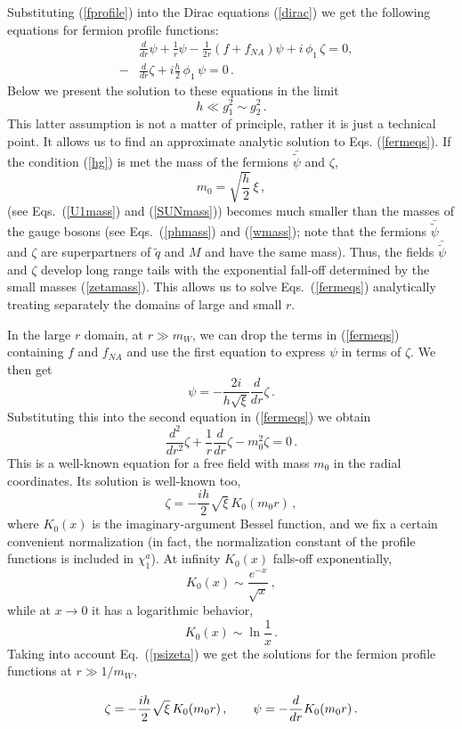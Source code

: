 \documentclass[epsfig,12pt]{article}
\def\beqn{\begin{eqnarray}}
\def\eeqn{\end{eqnarray}}
\def\beq{\begin{equation}}
\def\eeq{\end{equation}}
\begin{document}
Substituting (\ref{fprofile}) into the Dirac equations (\ref{dirac})
 we get the following equations for fermion profile functions:
\beqn
&&\frac{d}{dr}\psi +\frac1r\psi
-\frac1{2r}(f+f_{NA})\psi +i\,\phi_1\,\zeta=0,
\nonumber\\[3mm]
&-&\frac{d}{dr}\zeta
+i\frac{h}{2}\,\phi_1\,\psi =0\,.
\label{fermeqs}
\eeqn
Below we present the  solution to these equations
in the limit
\beq 
h\ll g_1^2\sim g_2^2  \,. 
\label{hg} 
\eeq
This latter assumption is not a matter of principle, rather it is just a technical
point. It allows us to find an approximate analytic  solution to Eqs. (\ref{fermeqs}).
If the condition (\ref{hg}) is met the mass of the fermions $\bar{\tilde{\psi}}$ and
$\zeta$,
\beq
m_0=\sqrt{\frac{h}{2}}\,\xi \,,
\label{zetamass}
\eeq
(see Eqs.~(\ref{U1mass}) and (\ref{SUNmass})) becomes much smaller than 
the masses of the
gauge bosons (see Eqs.~(\ref{phmass}) and (\ref{wmass}); note that the
fermions $\bar{\tilde{\psi}}$ and $\zeta$ are superpartners of $\tilde{q}$ and 
$M$ and have the same mass). Thus, the fields $\bar{\tilde{\psi}}$ and $\zeta$ 
develop long range tails with the exponential fall-off determined by the small masses
(\ref{zetamass}). This allows us to solve Eqs.~(\ref{fermeqs}) analytically treating
separately the domains of large and small $r$.

In the large $r$ domain, at $r \gg m_{W}$,
we can drop the terms in (\ref{fermeqs}) containing $f$ and $f_{NA}$ and use the
first  equation
to express $\psi$ in terms of $\zeta$. We then get
\beq
\psi= -\frac{2i}{h\sqrt{\xi}}\frac{d}{dr}\zeta\, .
\label{psizeta}
\eeq
Substituting this into the second equation in (\ref{fermeqs}) we obtain
\beq
\frac{d^2}{dr^2}\zeta+\frac1r\frac{d}{dr}\zeta-m_0^2\zeta=
0\,.
\label{zetaeq}
\eeq
This is a well-known equation for a free field with mass $m_0$
in the radial coordinates. Its solution is  well-known
too,
\beq
\zeta=-\frac{ih}{2}\sqrt{\xi}\, K_0(m_0 r)  \,,
\label{zeta}
\eeq
where $K_0 (x)$ is the imaginary-argument Bessel function, and we fix a
certain convenient normalization
(in fact, the normalization constant of the profile functions is included in 
$\chi^a_1$). At infinity
$K_0 (x)$  falls-off  exponentially,
\beq
K_0(x)\sim \frac{e^{-x}}{\sqrt{x}}\,,
\eeq
while at $x\to 0$ it has a
logarithmic behavior,
\beq
K_0(x)\sim \ln{\frac1x}\, .
\label{log}
\eeq
Taking into account Eq.~(\ref{psizeta}) we get the solutions for
the  fermion profile
functions at $r\gg 1/m_W$,
\beq
\zeta=-\frac{ih}{2}\sqrt{\xi}\, K_0(m_0 r)\,,\qquad \psi=- \frac{d}{dr}K_0(m_0 r)\, .
\rule{0mm}{7mm}
\label{psi}
\eeq
\mbox{}
\vspace{1mm}
\mbox{}
\end{document}
